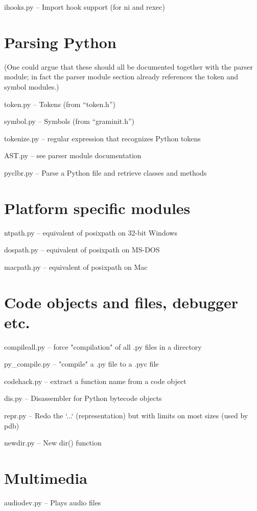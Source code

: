 ihooks.py -- Import hook support (for ni and rexec)


\section{Parsing Python}

(One could argue that these should all be documented together with the
parser module; in fact the parser module section already references
the token and symbol modules.)

token.py -- Tokens (from ``token.h'')

symbol.py -- Symbols (from ``graminit.h'')

tokenize.py -- regular expression that recognizes Python tokens

AST.py -- see parser module documentation

pyclbr.py -- Parse a Python file and retrieve classes and methods


\section{Platform specific modules}

ntpath.py -- equivalent of posixpath on 32-bit Windows

dospath.py -- equivalent of posixpath on MS-DOS

macpath.py -- equivalent of posixpath on Mac


\section{Code objects and files, debugger etc.}

compileall.py -- force "compilation" of all .py files in a directory

py_compile.py -- "compile" a .py file to a .pyc file

codehack.py -- extract a function name from a code object

dis.py -- Disassembler for Python bytecode objects

repr.py -- Redo the `...` (representation) but with limits on most
sizes (used by pdb)

newdir.py -- New dir() function


\section{Multimedia}

audiodev.py -- Plays audio files

